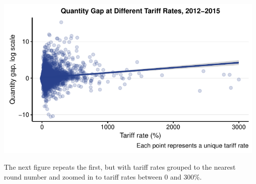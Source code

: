 \documentclass[10pt,]{article}
\begin{document}
\begin{center}\includegraphics{Figs/tariffVtrade_fig1-1} \end{center}

The next figure repeats the first, but with tariff rates grouped to the
nearest round number and zoomed in to tariff rates between 0 and 300\%.
\end{document}
